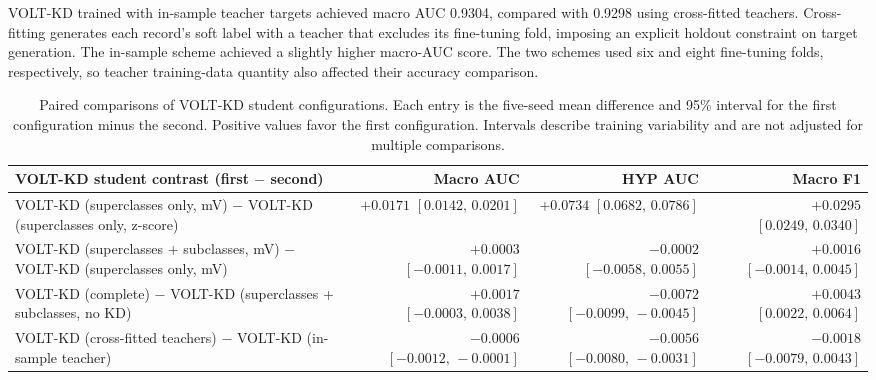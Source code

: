 \documentclass[11pt,a4paper]{article}
\begin{document}
VOLT-KD trained with in-sample teacher targets achieved macro AUC 0.9304, compared with 0.9298 using cross-fitted teachers. Cross-fitting generates each record's soft label with a teacher that excludes its fine-tuning fold, imposing an explicit holdout constraint on target generation. The in-sample scheme achieved a slightly higher macro-AUC score. The two schemes used six and eight fine-tuning folds, respectively, so teacher training-data quantity also affected their accuracy comparison.
\begin{table}[htbp]
\centering\footnotesize
\setlength{\tabcolsep}{4pt}
\caption{Paired comparisons of VOLT-KD student configurations. Each entry is the five-seed mean difference and 95\% interval for the first configuration minus the second. Positive values favor the first configuration. Intervals describe training variability and are not adjusted for multiple comparisons.}\label{tab:effects}
\begin{tabularx}{\linewidth}{Yrrr}
\toprule
VOLT-KD student contrast (first $-$ second) & Macro AUC & HYP AUC & Macro F1 \\
\midrule
VOLT-KD (superclasses only, mV) $-$ VOLT-KD (superclasses only, z-score) &  &  &  \\
VOLT-KD (superclasses + subclasses, mV) $-$ VOLT-KD (superclasses only, mV) &  &  &  \\
VOLT-KD (complete) $-$ VOLT-KD (superclasses + subclasses, no KD) &  &  &  \\
VOLT-KD (cross-fitted teachers) $-$ VOLT-KD (in-sample teacher) &  &  &  \\
\bottomrule
\end{tabularx}
\par\vspace{3pt}{\footnotesize All configurations use millivolt inputs except the input-processing control. The no-distillation student uses superclass and subclass targets. Teacher-scheme comparisons evaluate VOLT-KD students trained using the respective soft labels.}

\end{table}
\end{document}
